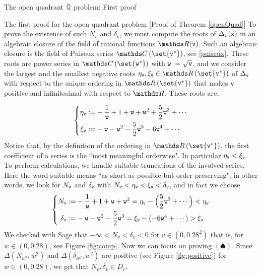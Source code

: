 \documentclass[11pt, a4paper, english, twoside, notitlepage, openright]{report}
\begin{document}
\begin{chapter}{The open quadrant $\mathcal{Q}$ problem: First proof}
\begin{section}{The first proof for the open quadrant problem} [Proof of Theorem \ref{openQuad}]
To prove the existence of such $N_v$ and $\delta_v$, we must compute the roots of $\Delta_v({\tt x})$ in an algebraic closure of the field of rational functions $\R({\tt v})$. Such an algebraic closure is the field of Puiseux series $\C\left(\set{{\tt v}^*}\right)$, see \ref{puiseux}. These roots are power series in $\C\left(\set{{\tt w}^*}\right)$ with ${\tt w}:=\sqrt{\tt v}$, and we consider the largest and the smallest negative roots $\eta_{\tt v},\xi_{\tt v}\in\R\left(\set{{\tt v}^*}\right)$ of $\Delta_{\tt v}$ with respect to the unique ordering in $\R\left(\set{{\tt v}^*}\right)$ that makes ${\tt v}$ positive and infinitesimal with respect to $\R$. These roots are:
			
\begin{equation*}\left\{\begin{split}
\eta_{\tt v}:=&-\frac{1}{\tt w}+1+{\tt w}+{\tt w}^2+\frac{5}{2}{\tt w}^3+\cdots\\
\xi_{\tt v}:=&-{\tt w}-{\tt w}^2-\frac{5}{2}{\tt w}^3-6{\tt w}^4+\cdots
\end{split}\right.
\end{equation*}
Notice that, by the definition of the ordering in $\R\left(\set{{\tt v}^*}\right)$, the first coefficient of a series is the ``most meaningful orderwise". In particular $\eta_{\tt v}<\xi_{\tt v}$. To perform calculations, we handle suitable truncations of the involved series. Here the word suitable means ``as short as possible but order preserving"; in other words, we look for $N_{\tt v}$ and $\delta_{\tt v}$ with $N_{\tt v}<\eta_{\tt v}<\xi_{\tt v}<\delta_{\tt v}$, and in fact we choose
\begin{equation*}\left\{
\begin{split}
N_{\tt v}:=&-\frac{1}{\tt w}+1+{\tt w}+{\tt w}^2=\eta_{\tt v}-\Big(\frac{5}{2}{\tt w}^3+\cdots\Big)<\eta_{\tt v}\\
\delta_{\tt v}:=&-{\tt w}-{\tt w}^2-\frac{5}{2}{\tt w}^3=\xi_{\tt v}-(-6{\tt w}^4+\cdots)>\xi_{\tt v}.
\end{split}\right.
\end{equation*}
We checked with Sage that $-\infty<N_v<\delta_v<0$ for $v\in (0,0.28^2)$ that is, for $w\in(0,0.28)$, see Figure \ref{fig:comp}. Now we can focus on proving $(\spadesuit)$. Since $\Delta(N_{w^2},w^2)$ and $\Delta(\delta_{w^2},w^2)$ are positive (see Figure \ref{fig:positive}) for $w\in (0,0.28)$, we get that $N_v,\delta_v\in D_v$.
\begin{figure}[h]\hspace{-0.25cm}
\begin{subfigure}{.50\linewidth}\centering

\end{subfigure}
\end{figure}
\end{section}
\end{chapter}
\end{document}
